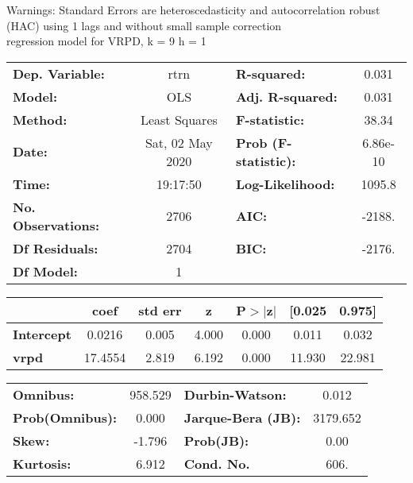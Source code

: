 Warnings: \newline
 [1] Standard Errors are heteroscedasticity and autocorrelation robust (HAC) using 1 lags and without small sample correction\\ 

regression model for VRPD, k = 9 h = 1\begin{center}
\begin{tabular}{lclc}
\toprule
\textbf{Dep. Variable:}    &       rtrn       & \textbf{  R-squared:         } &     0.031   \\
\textbf{Model:}            &       OLS        & \textbf{  Adj. R-squared:    } &     0.031   \\
\textbf{Method:}           &  Least Squares   & \textbf{  F-statistic:       } &     38.34   \\
\textbf{Date:}             & Sat, 02 May 2020 & \textbf{  Prob (F-statistic):} &  6.86e-10   \\
\textbf{Time:}             &     19:17:50     & \textbf{  Log-Likelihood:    } &    1095.8   \\
\textbf{No. Observations:} &        2706      & \textbf{  AIC:               } &    -2188.   \\
\textbf{Df Residuals:}     &        2704      & \textbf{  BIC:               } &    -2176.   \\
\textbf{Df Model:}         &           1      & \textbf{                     } &             \\
\bottomrule
\end{tabular}
\begin{tabular}{lcccccc}
                   & \textbf{coef} & \textbf{std err} & \textbf{z} & \textbf{P$> |$z$|$} & \textbf{[0.025} & \textbf{0.975]}  \\
\midrule
\textbf{Intercept} &       0.0216  &        0.005     &     4.000  &         0.000        &        0.011    &        0.032     \\
\textbf{vrpd}      &      17.4554  &        2.819     &     6.192  &         0.000        &       11.930    &       22.981     \\
\bottomrule
\end{tabular}
\begin{tabular}{lclc}
\textbf{Omnibus:}       & 958.529 & \textbf{  Durbin-Watson:     } &    0.012  \\
\textbf{Prob(Omnibus):} &   0.000 & \textbf{  Jarque-Bera (JB):  } & 3179.652  \\
\textbf{Skew:}          &  -1.796 & \textbf{  Prob(JB):          } &     0.00  \\
\textbf{Kurtosis:}      &   6.912 & \textbf{  Cond. No.          } &     606.  \\
\bottomrule
\end{tabular}
\end{center}

